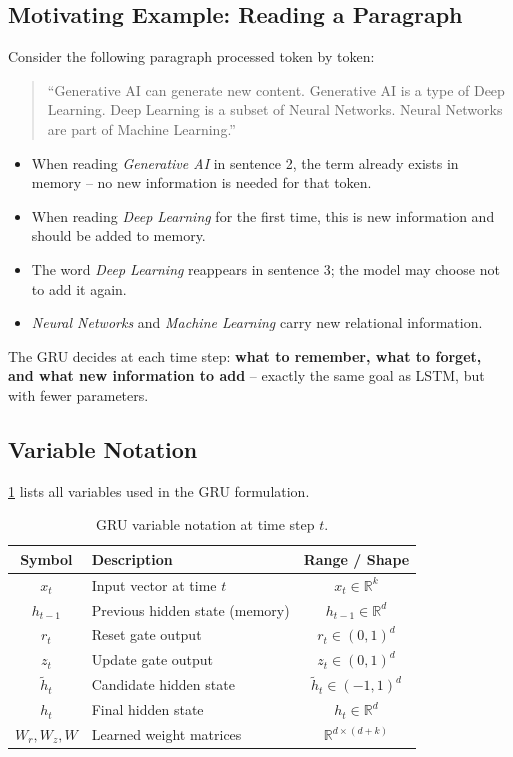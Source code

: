\documentclass[12pt,a4paper]{article}
\begin{document}
\subsection{Motivating Example: Reading a Paragraph}

\begin{example}[title=Sequential Memory in Text]
Consider the following paragraph processed token by token:
\begin{quote}
``Generative AI can generate new content. Generative AI is a type of Deep Learning.
Deep Learning is a subset of Neural Networks. Neural Networks are part of Machine Learning.''
\end{quote}
\begin{itemize}[noitemsep]
  \item When reading \emph{Generative AI} in sentence 2, the term already exists in memory -- no
        new information is needed for that token.
  \item When reading \emph{Deep Learning} for the first time, this is new information and should
        be added to memory.
  \item The word \emph{Deep Learning} reappears in sentence 3; the model may choose not to add
        it again.
  \item \emph{Neural Networks} and \emph{Machine Learning} carry new relational information.
\end{itemize}
The GRU decides at each time step: \textbf{what to remember, what to forget, and what new information
to add} -- exactly the same goal as LSTM, but with fewer parameters.
\end{example}

\subsection{Variable Notation}

\cref{tab:gru_notation} lists all variables used in the GRU formulation.

\begin{table}[htbp]
\centering
\caption{GRU variable notation at time step $t$.}
\label{tab:gru_notation}
\begin{tabular}{@{}clc@{}}
\toprule
\textbf{Symbol} & \textbf{Description} & \textbf{Range / Shape} \\
\midrule
$x_t$ & Input vector at time $t$ & $x_t \in \mathbb{R}^k$ \\
$h_{t-1}$ & Previous hidden state (memory) & $h_{t-1} \in \mathbb{R}^d$ \\
$r_t$ & Reset gate output & $r_t \in (0,1)^d$ \\
$z_t$ & Update gate output & $z_t \in (0,1)^d$ \\
$\tilde{h}_t$ & Candidate hidden state & $\tilde{h}_t \in (-1,1)^d$ \\
$h_t$ & Final hidden state & $h_t \in \mathbb{R}^d$ \\
$W_r, W_z, W$ & Learned weight matrices & $\mathbb{R}^{d \times (d+k)}$ \\
\bottomrule
\end{tabular}
\end{table}
\end{document}
